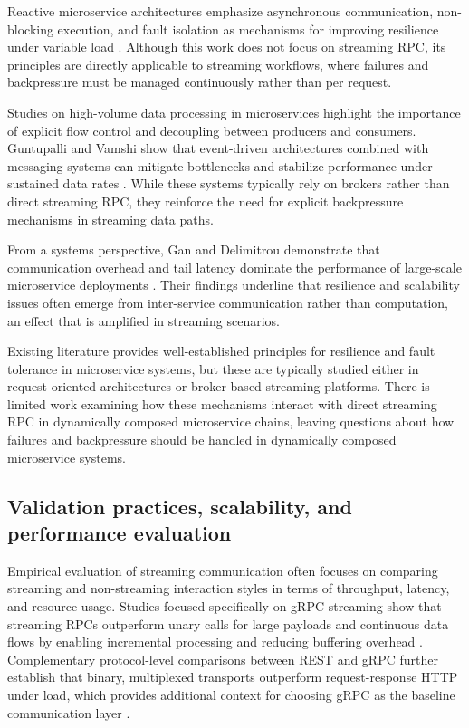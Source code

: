 Reactive microservice architectures emphasize asynchronous communication, non-blocking execution, and fault isolation as mechanisms for improving resilience under variable load \cite{rasheedh2021reactive}. Although this work does not focus on streaming RPC, its principles are directly applicable to streaming workflows, where failures and backpressure must be managed continuously rather than per request.

Studies on high-volume data processing in microservices highlight the importance of explicit flow control and decoupling between producers and consumers. Guntupalli and Vamshi show that event-driven architectures combined with messaging systems can mitigate bottlenecks and stabilize performance under sustained data rates \cite{guntupalli2023highvolume}. While these systems typically rely on brokers rather than direct streaming RPC, they reinforce the need for explicit backpressure mechanisms in streaming data paths.

From a systems perspective, Gan and Delimitrou demonstrate that communication overhead and tail latency dominate the performance of large-scale microservice deployments \cite{gan2018architectural}. Their findings underline that resilience and scalability issues often emerge from inter-service communication rather than computation, an effect that is amplified in streaming scenarios.

Existing literature provides well-established principles for resilience and fault tolerance in microservice systems, but these are typically studied either in request-oriented architectures or broker-based streaming platforms. There is limited work examining how these mechanisms interact with direct streaming RPC in dynamically composed microservice chains, leaving questions about how failures and backpressure should be handled in dynamically composed microservice systems.

\subsection{Validation practices, scalability, and performance evaluation}

Empirical evaluation of streaming communication often focuses on comparing streaming and non-streaming interaction styles in terms of throughput, latency, and resource usage. Studies focused specifically on gRPC streaming show that streaming RPCs outperform unary calls for large payloads and continuous data flows by enabling incremental processing and reducing buffering overhead \cite{roohitavaf2019logplayer,sodankoor2026grpcbench}. Complementary protocol-level comparisons between REST and gRPC further establish that binary, multiplexed transports outperform request-response HTTP under load, which provides additional context for choosing gRPC as the baseline communication layer \cite{restgrpccomparison,lahtevenoja2021communication}.

